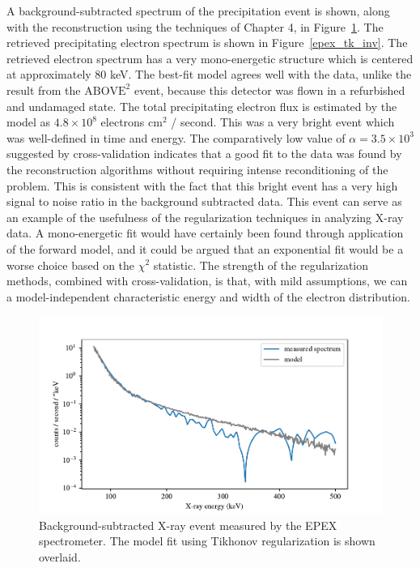 A background-subtracted spectrum of the precipitation event is shown, along with the reconstruction using the techniques of Chapter 4, in Figure~\ref{epex_fit_comparison}. The retrieved precipitating electron spectrum is shown in Figure~\ref{epex_tk_inv}. The retrieved electron spectrum has a very mono-energetic structure which is centered at approximately 80 keV. The best-fit model agrees well with the data, unlike the result from the $\text{ABOVE}^2$ event, because this detector was flown in a refurbished and undamaged state. The total precipitating electron flux is estimated by the model as $4.8\times 10^8$ electrons $\text{cm}^2$ / second. This was a very bright event which was well-defined in time and energy. The comparatively low value of $\alpha = 3.5\times10^3$ suggested by cross-validation indicates that a good fit to the data was found by the reconstruction algorithms without requiring intense reconditioning of the problem. This is consistent with the fact that this bright event has a very high signal to noise ratio in the background subtracted data. This event can serve as an example of the usefulness of the regularization techniques in analyzing X-ray data. A mono-energetic fit would have certainly been found through application of the forward model, and it could be argued that an exponential fit would be a worse choice based on the $\chi ^2$ statistic. The strength of the regularization methods, combined with cross-validation, is that, with mild assumptions, we can a model-independent characteristic energy and width of the electron distribution. 

\begin{figure}[p]
    \centering
    \includegraphics[width=1.0\textwidth]{figures/chapter_5/epex_fit_comparison/epex_fit_comparison.pdf}
    \caption{Background-subtracted X-ray event measured by the EPEX spectrometer. The model fit using Tikhonov regularization is shown overlaid.}
    \label{epex_fit_comparison}
\end{figure}

